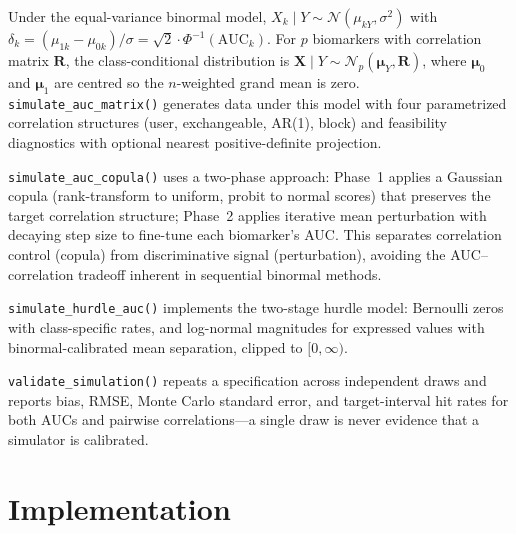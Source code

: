 \documentclass[11pt,a4paper]{article}
\begin{document}
Under the equal-variance binormal model, $X_k \mid Y \sim
\mathcal{N}(\mu_{kY}, \sigma^2)$ with
$\delta_k = (\mu_{1k} - \mu_{0k})/\sigma = \sqrt{2} \cdot
\Phi^{-1}(\text{AUC}_k)$.  For $p$ biomarkers with correlation matrix
$\mathbf{R}$, the class-conditional distribution is $\mathbf{X} \mid Y \sim
\mathcal{N}_p(\bm{\mu}_Y, \mathbf{R})$, where $\bm{\mu}_0$ and $\bm{\mu}_1$
are centred so the $n$-weighted grand mean is zero.
\texttt{simulate\_auc\_matrix()} generates data under this model with four
parametrized correlation structures (user, exchangeable, AR(1), block) and
feasibility diagnostics with optional nearest positive-definite projection.

\texttt{simulate\_auc\_copula()} uses a two-phase approach: Phase~1 applies a
Gaussian copula (rank-transform to uniform, probit to normal scores) that
preserves the target correlation structure; Phase~2 applies iterative mean
perturbation with decaying step size to fine-tune each biomarker's AUC.  This
separates correlation control (copula) from discriminative signal
(perturbation), avoiding the AUC--correlation tradeoff inherent in sequential
binormal methods.

\texttt{simulate\_hurdle\_auc()} implements the two-stage hurdle model:
Bernoulli zeros with class-specific rates, and log-normal magnitudes for
expressed values with binormal-calibrated mean separation, clipped to
$[0, \infty)$.

\texttt{validate\_simulation()} repeats a specification across independent
draws and reports bias, RMSE, Monte Carlo standard error, and
target-interval hit rates for both AUCs and pairwise correlations---a single
draw is never evidence that a simulator is calibrated.

\section{Implementation}
\end{document}
